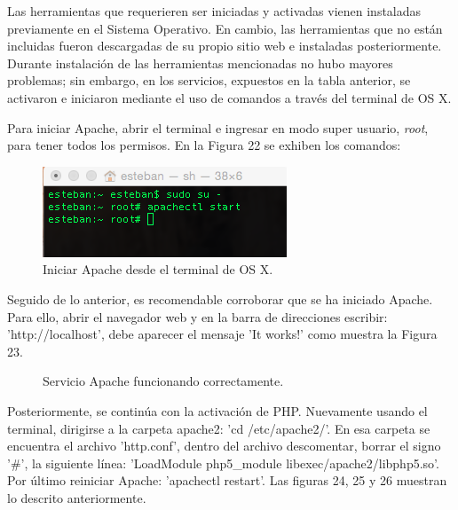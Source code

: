 Las herramientas que requerieren ser iniciadas y activadas vienen instaladas previamente en el Sistema Operativo. En cambio, las herramientas que no están incluidas fueron descargadas de su propio sitio web e instaladas posteriormente.\\ 

Durante instalación de las herramientas mencionadas no hubo mayores problemas; sin embargo, en los servicios, expuestos en la tabla anterior, se activaron e iniciaron mediante el uso de comandos a través del terminal de OS X. 

Para iniciar Apache, abrir el terminal e ingresar en modo super usuario, \textit{root}, para tener todos los permisos. En la Figura 22 se exhiben los comandos:

\begin{figure}[H]
\centering
\includegraphics[scale=0.90]{images/capitulo5/apacheStart.png}
\caption{Iniciar Apache desde el terminal de OS X.}
\label{apacheStart}
\end{figure} 

Seguido de lo anterior, es recomendable corroborar que se ha iniciado Apache. Para ello, abrir el navegador web y en la barra de direcciones escribir: 'http://localhost', debe aparecer el mensaje 'It works!' como muestra la Figura 23.\\

\begin{figure}[H]
\centering
\setlength\fboxsep{0pt}
\setlength\fboxrule{0.5pt}
\caption{Servicio Apache funcionando correctamente.}
\label{localhost}
\end{figure}

Posteriormente, se continúa con la activación de PHP. Nuevamente usando el terminal, dirigirse a la carpeta apache2: 'cd /etc/apache2/'. En esa carpeta se encuentra el archivo 'http.conf', dentro del archivo descomentar, borrar el signo '\#', la siguiente línea: 'LoadModule php5\_module libexec/apache2/libphp5.so'. Por último reiniciar Apache: 'apachectl restart'. Las figuras 24, 25 y 26 muestran lo descrito anteriormente.\\

